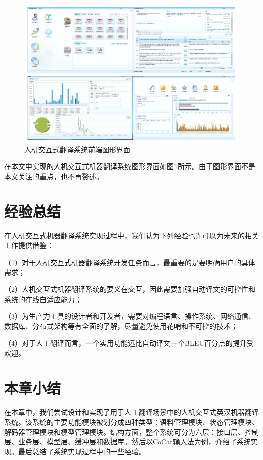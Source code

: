 \begin{figure}[!bt]
	\centering
	\includegraphics[width=\textwidth]{Figure/Figure_6_3.pdf}
	\caption{人机交互式翻译系统前端图形界面}
	\label{Fig_system_gui}
\end{figure}

在本文中实现的人机交互式机器翻译系统图形界面如图\ref{Fig_system_gui}所示。由于图形界面不是本文关注的重点，也不再赘述。

\section{经验总结}

在人机交互式机器翻译系统实现过程中，我们认为下列经验也许可以为未来的相关工作提供借鉴：

（1）对于人机交互式机器翻译系统开发任务而言，最重要的是要明确用户的具体需求；

（2）人机交互式机器翻译系统的要义在交互，因此需要加强自动译文的可控性和系统的在线自适应能力；

（3）为生产力工具的设计者和开发者，需要对编程语言、操作系统、网络通信、数据库、分布式架构等有全面的了解，尽量避免使用花哨和不可控的技术；

（4）对于人工翻译而言，一个实用功能远比自动译文一个BLEU百分点的提升受欢迎。

\section{本章小结}

在本章中，我们尝试设计和实现了用于人工翻译场景中的人机交互式英汉机器翻译系统。该系统的主要功能模块被划分成四种类型：语料管理模块、状态管理模块、解码器管理模块和模型管理模块。结构方面，整个系统可分为六层：接口层、控制层、业务层、模型层、缓冲层和数据库。然后以CoCat输入法为例，介绍了系统实现。最后总结了系统实现过程中的一些经验。